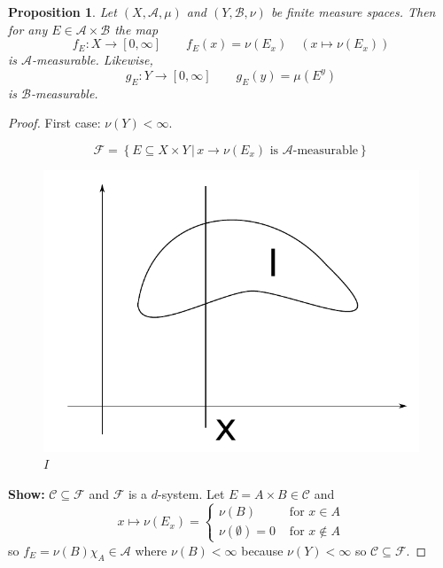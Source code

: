 \documentclass{article}
\newtheorem{proposition}{Proposition}  \numberwithin{proposition}{section}
\newcommand{\setdef}[2]{\left\{\left.#1\,\right|\,#2\right\}}
\begin{document}
\begin{proposition} %
  Let $(X, \mathcal A, \mu)$ and $(Y, \mathcal B, \nu)$ be finite measure spaces. Then for any $E \in \mathcal A \times \mathcal B$ the map
  \[ f_E: X \to [0,\infty] \qquad f_E(x) = \nu(E_x) \quad (x \mapsto \nu(E_x)) \]
  is $\mathcal A$-measurable. Likewise,
  \[ g_E: Y \to [0,\infty] \qquad g_E(y) = \mu(E^y) \]
  is $\mathcal B$-measurable.
\end{proposition}
\begin{proof}
  First case: $\nu(Y) < \infty$.

  \[ \mathcal F = \setdef{E \subseteq X \times Y}{x \to \nu(E_x) \text{ is } \mathcal A\text{-measurable}} \]
  \begin{figure}[!h]
    \begin{center}
      \includegraphics{img/23_I.pdf}
      \caption{$I$}
      \label{img:23i}
    \end{center}
  \end{figure}

  \textbf{Show:} $\mathcal C \subseteq \mathcal F$ and $\mathcal F$ is a $d$-system.
  Let $E = A \times B \in \mathcal C$ and
  \[
    x \mapsto \nu(E_x) = \begin{cases}
      \nu(B) & \text{ for } x \in A \\
      \nu(\emptyset) = 0 & \text{ for } x \not\in A
    \end{cases}
  \]
  so $f_E = \nu(B) \chi_A \in \mathcal A$ where $\nu(B) < \infty$ because $\nu(Y) < \infty$ so $\mathcal C \subseteq \mathcal F$.


\end{proof}
\end{document}
